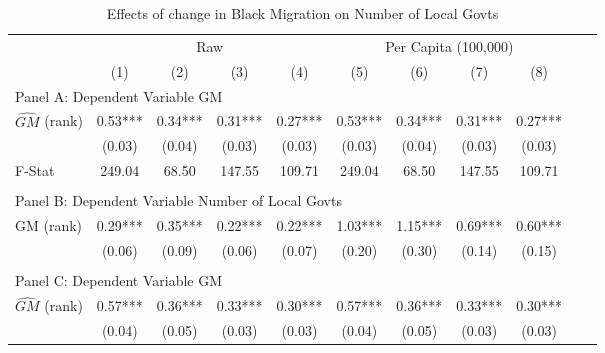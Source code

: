  \begin{table}[htbp]\centering {} \begin{threeparttable} \caption{Effects of change in Black Migration on Number of Local Govts} \begin{tabular}{l*{10}{c}} \toprule
                &\multicolumn{4}{c}{Raw}                                    &\multicolumn{4}{c}{Per Capita (100,000)}                   \\\cmidrule(lr){2-5}\cmidrule(lr){6-9}
                &\multicolumn{1}{c}{(1)}   &\multicolumn{1}{c}{(2)}   &\multicolumn{1}{c}{(3)}   &\multicolumn{1}{c}{(4)}   &\multicolumn{1}{c}{(5)}   &\multicolumn{1}{c}{(6)}   &\multicolumn{1}{c}{(7)}   &\multicolumn{1}{c}{(8)}   \\
\cmidrule(lr){1-9}
\multicolumn{8}{l}{Panel A: Dependent Variable GM}\\
\cmidrule(lr){1-9}
$\hat{GM}$ (rank)&       0.53***&       0.34***&       0.31***&       0.27***&       0.53***&       0.34***&       0.31***&       0.27***\\
                &     (0.03)   &     (0.04)   &     (0.03)   &     (0.03)   &     (0.03)   &     (0.04)   &     (0.03)   &     (0.03)   \\
\midrule
F-Stat          &     249.04   &      68.50   &     147.55   &     109.71   &     249.04   &      68.50   &     147.55   &     109.71   \\
\cmidrule[\heavyrulewidth](lr){1-9} \\ \cmidrule[\heavyrulewidth](lr){1-9}
\multicolumn{8}{l}{Panel B: Dependent Variable Number of Local Govts}\\
\cmidrule(lr){1-9}
GM  (rank)      &       0.29***&       0.35***&       0.22***&       0.22***&       1.03***&       1.15***&       0.69***&       0.60***\\
                &     (0.06)   &     (0.09)   &     (0.06)   &     (0.07)   &     (0.20)   &     (0.30)   &     (0.14)   &     (0.15)   \\
\cmidrule[\heavyrulewidth](lr){1-9} \\ \cmidrule[\heavyrulewidth](lr){1-9}
\multicolumn{8}{l}{Panel C: Dependent Variable GM}\\
\cmidrule(lr){1-9}
$\hat{GM}$ (rank)&       0.57***&       0.36***&       0.33***&       0.30***&       0.57***&       0.36***&       0.33***&       0.30***\\
                &     (0.04)   &     (0.05)   &     (0.03)   &     (0.03)   &     (0.04)   &     (0.05)   &     (0.03)   &     (0.03)   \\

\end{tabular}
\end{threeparttable}
\end{table}
